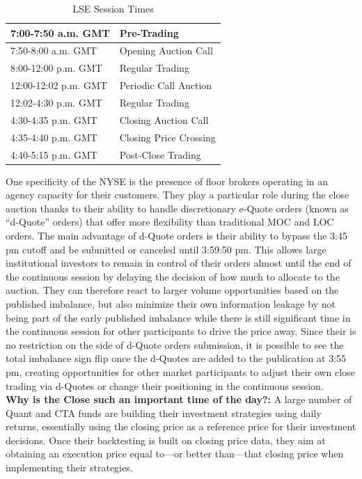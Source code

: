 \begin{table}[!ht]
   \centering
   \caption{LSE Session Times\label{tab:LSEclose}}
   \begin{tabular}{ll} 
	7:00-7:50 a.m. GMT & Pre-Trading  \\ \hline
	7:50-8:00 a.m. GMT & Opening Auction Call\\ \hline
	8:00-12:00 p.m. GMT & Regular Trading \\ \hline
	12:00-12:02 p.m. GMT & Periodic Call Auction \\ \hline
	12:02-4:30 p.m. GMT & Regular Trading \\ \hline
	4:30-4:35 p.m. GMT & Closing Auction Call \\ \hline
	4:35-4:40 p.m. GMT & Closing Price Crossing \\ \hline	
	4:40-5:15 p.m. GMT & Post-Close Trading
   \end{tabular}
\end{table}	

One specificity of the NYSE is the presence of floor brokers operating in an agency capacity for their customers. They play a particular role during the close auction thanks to their ability to handle discretionary e-Quote orders (known as ``d-Quote'' orders) that offer more flexibility than traditional MOC and LOC orders. The main advantage of d-Quote orders is their ability to bypass the 3:45 pm cutoff and be submitted or canceled until 3:59:50 pm. This allows large institutional investors to remain in control of their orders almost until the end of the continuous session by delaying the decision of how much to allocate to the auction. They can therefore react to larger volume opportunities based on the published imbalance, but also minimize their own information leakage by not being part of the early published imbalance while there is still significant time in the continuous session for other participants to drive the price away.  Since their is no restriction on the side of d-Quote orders submission, it is possible to see the total imbalance sign flip once the d-Quotes are added to the publication at 3:55 pm, creating opportunities for other market participants to adjust their own close trading via d-Quotes or change their positioning in the continuous session. \\


\noindent\textbf{Why is the Close such an important time of the day?:} A large number of Quant and CTA funds are building their investment strategies using daily returns, essentially using the closing price as a reference price for their investment decisions. Once their backtesting is built on closing price data, they aim at obtaining an execution price equal to---or better than---that closing price when implementing their strategies. 


